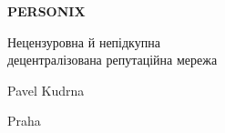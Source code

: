 \thispagestyle{empty}
\begin{center}
  {\sffamily\bfseries\fontsize{34}{40}\selectfont PERSONIX\par}
  \vspace{2.2em}
  {\rmfamily\large Нецензуровна й непідкупна\\[0.25em]
   децентралізована репутаційна мережа\par}
\end{center}
\begin{center}
  {\rmfamily\Large Pavel Kudrna\par}
  \vspace{0.45em}
  {\rmfamily\small Praha\quad\textbullet{}\par}
\end{center}
\clearpage
